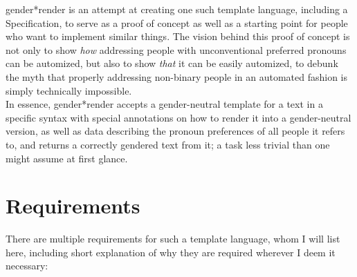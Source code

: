 \documentclass{article}
\newcommand{\GenderRender}{
    gender*render
}
\begin{document}
    \GenderRender is an attempt at creating one such template language, including a Specification, to serve as a proof of concept as well as a starting point for people who want to implement similar things.
    The vision behind this proof of concept is not only to show \emph{how} addressing people with unconventional preferred pronouns can be automized, but also to show \emph{that} it can be easily automized, to debunk the myth that properly addressing non-binary people in an automated fashion is simply technically impossible.\\

    In essence, \GenderRender accepts a gender-neutral template for a text in a specific syntax with special annotations on how to render it into a gender-neutral version, as well as data describing the pronoun preferences of all people it refers to, and returns a correctly gendered text from it;
    a task less trivial than one might assume at first glance.\\

\section{Requirements}

    There are multiple requirements for such a template language, whom I will list here, including short explanation of why they are required wherever I deem it necessary:
\end{document}
